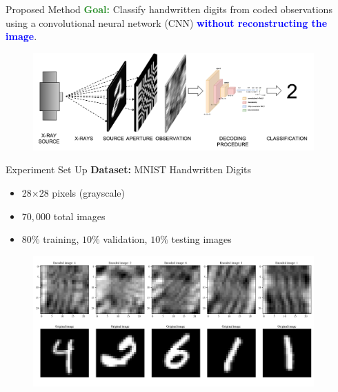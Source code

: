 \documentclass[10pt, t]{beamer}
\begin{document}
\begin{frame}{Proposed Method}
	\textcolor{forestgreen}{\textbf{Goal:}} Classify handwritten digits from coded observations using a convolutional neural network (CNN) \textcolor{blue}{\textbf{without reconstructing the image}}.
	\bigskip
		\begin{figure}
		\includegraphics[width = 0.96\textwidth]{images/task_diagram.png}
	\end{figure}
\end{frame}
\begin{frame}{Experiment Set Up}
	\textbf{Dataset:} MNIST Handwritten Digits 
		\begin{itemize}
		\item 28$\times$28 pixels (grayscale)
		\item $70,000$ total images
		\item $80\%$ training, $10\%$ validation, $10\%$ testing images 
	\end{itemize}
    \medskip
	\pause
	\begin{figure}
		\includegraphics[width = 0.96\textwidth]{images/encoded_original_examples.png}
	\end{figure}
\end{frame}
\end{document}
